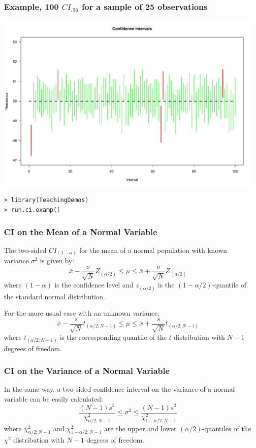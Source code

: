 \documentclass[10pt]{beamer}
\begin{document}
\begin{frame}
  \frametitle{Example, 100 $CI_{.95}$ for a sample of 25 observations}
  \begin{center}
    \includegraphics[width=.9\textwidth]{img/CIs}
  \end{center}
  \medskip
\begin{verbatim}
> library(TeachingDemos)
> run.ci.examp()
\end{verbatim}
\end{frame}

\begin{frame}
  \frametitle{CI on the Mean of a Normal Variable} 
  The two-sided $CI_{(1-\alpha)}$ for the mean of a normal population
  with known variance $\sigma^2$ is given by:
  \begin{equation*}
    \bar{x} - \frac{\sigma}{\sqrt{N}}Z_{(\alpha/2)} \leq \mu \leq \bar{x} + \frac{\sigma}{\sqrt{N}}Z_{(\alpha/2)}
  \end{equation*}
  where $(1-\alpha)$ is the confidence level and $z_{(\alpha/2)}$ is
  the $(1-\alpha/2)$-quantile of the standard normal distribution.

  For the more usual case with an unknown variance,
  \begin{equation*}
    \bar{x} - \frac{s}{\sqrt{N}}t_{(\alpha/2;N-1)} \leq \mu \leq \bar{x} + \frac{s}{\sqrt{N}}t_{(\alpha/2;N-1)} 
  \end{equation*}
  where $t_{(\alpha/2;N-1)}$ is the corresponding quantile of the $t$
  distribution with $N-1$ degrees of freedom.
\end{frame}

\begin{frame}
  \frametitle{CI on the Variance of a Normal Variable} 
  In the same way, a two-sided confidence interval on the variance of
  a normal variable can be easily calculated:
  \begin{equation*}
    \frac{(N-1)s^2}{\chi^2_{\alpha/2;N-1}} \leq \sigma^2 \leq \frac{(N-1)s^2}{\chi^2_{1-\alpha/2;N-1}}
  \end{equation*}
  where $\chi^2_{\alpha/2;N-1}$ and $\chi^2_{1-\alpha/2;N-1}$ are the
  upper and lower $(\alpha/2)$-quantiles of the $\chi^2$ distribution
  with $N-1$ degrees of freedom.
\end{frame}
\end{document}
